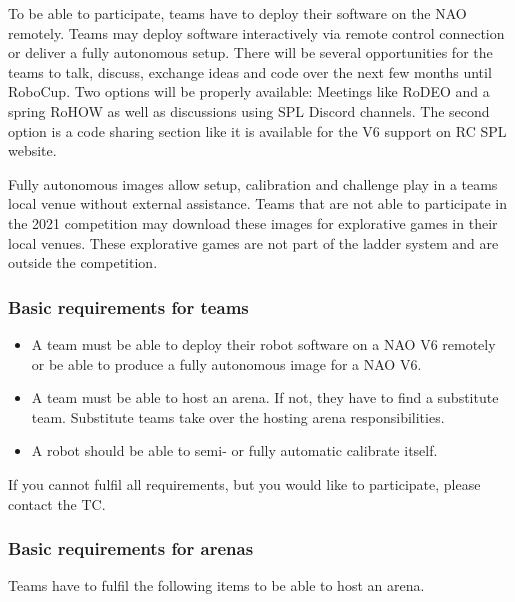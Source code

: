 To be able to participate, teams have to deploy their software on the NAO remotely. Teams may deploy software interactively via remote control connection or deliver a fully autonomous setup. There will be several opportunities for the teams to talk, discuss, exchange ideas and code over the next few months until RoboCup. Two options will be properly available: Meetings like RoDEO and a spring RoHOW as well as discussions using SPL Discord channels. The second option is a code sharing section like it is available for the V6 support on RC SPL website.

Fully autonomous images allow setup, calibration and challenge play in a teams local venue without external assistance. Teams that are not able to participate in the 2021 competition may download these images for explorative games in their local venues. These explorative games are not part of the ladder system and are outside the competition.

\subsubsection{Basic requirements for teams}
\label{sec:c3_BasicRequirementsForTeams}
\begin{itemize}
    \item A team must be able to deploy their robot software on a NAO V6 remotely or be able to produce a fully autonomous image for a NAO V6.
    \item A team must be able to host an arena. If not, they have to find a substitute team. Substitute teams take over the hosting arena responsibilities.
    \item A robot should be able to semi- or fully automatic calibrate itself.
\end{itemize}

If you cannot fulfil all requirements, but you would like to participate, please contact the TC.

\subsubsection{Basic requirements for arenas}
\label{sec:c3_BasicRequirementsForArenas}
Teams have to fulfil the following items to be able to host an arena.

